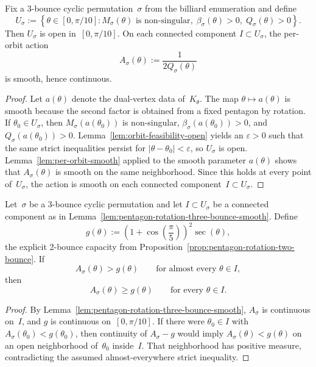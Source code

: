 \begin{unverified}
\begin{lemma}
\label{lem:pentagon-rotation-three-bounce-smooth}
Fix a 3-bounce cyclic permutation~$\sigma$ from the billiard enumeration and
define
\[
  U_\sigma
  :=
  \left\{
    \theta \in [0,\pi/10] :
    M_\sigma(\theta) \text{ is non-singular},\;
    \beta_\sigma(\theta) > 0,\;
    Q_\sigma(\theta) > 0
  \right\}.
\]
Then $U_\sigma$ is open in~$[0,\pi/10]$. On each connected component
$I \subset U_\sigma$, the per-orbit action
\[
  A_\sigma(\theta) := \frac{1}{2Q_\sigma(\theta)}
\]
is smooth, hence continuous.
\end{lemma}

\begin{proof}
Let $a(\theta)$ denote the dual-vertex data of~$K_\theta$.
The map $\theta \mapsto a(\theta)$ is smooth because the second factor is
obtained from a fixed pentagon by rotation.
If $\theta_0 \in U_\sigma$, then
$M_\sigma(a(\theta_0))$ is non-singular,
$\beta_\sigma(a(\theta_0)) > 0$,
and $Q_\sigma(a(\theta_0)) > 0$.
Lemma~\ref{lem:orbit-feasibility-open} yields an $\varepsilon > 0$ such that
the same strict inequalities persist for
$|\theta-\theta_0|<\varepsilon$, so $U_\sigma$ is open.
Lemma~\ref{lem:per-orbit-smooth} applied to the smooth parameter
$a(\theta)$ shows that $A_\sigma(\theta)$ is smooth on the same
neighborhood. Since this holds at every point of~$U_\sigma$, the action is
smooth on each connected component~$I \subset U_\sigma$.
\end{proof}
\end{unverified}

\begin{unverified}
\begin{lemma}
\label{lem:pentagon-rotation-three-bounce-continuity}
Let~$\sigma$ be a 3-bounce cyclic permutation and let $I \subset U_\sigma$ be
a connected component as in
Lemma~\ref{lem:pentagon-rotation-three-bounce-smooth}. Define
\[
  g(\theta)
  :=
  \left(1+\cos\left(\frac{\pi}{5}\right)\right)^2 \sec(\theta),
\]
the explicit 2-bounce capacity from
Proposition~\ref{prop:pentagon-rotation-two-bounce}. If
\[
  A_\sigma(\theta) > g(\theta)
  \qquad
  \text{for almost every } \theta \in I,
\]
then
\[
  A_\sigma(\theta) \ge g(\theta)
  \qquad
  \text{for every } \theta \in I.
\]
\end{lemma}

\begin{proof}
By Lemma~\ref{lem:pentagon-rotation-three-bounce-smooth},
$A_\sigma$ is continuous on~$I$, and $g$ is continuous on~$[0,\pi/10]$.
If there were $\theta_0 \in I$ with $A_\sigma(\theta_0) < g(\theta_0)$, then
continuity of $A_\sigma-g$ would imply $A_\sigma(\theta) < g(\theta)$ on an
open neighborhood of~$\theta_0$ inside~$I$. That neighborhood has positive
measure, contradicting the assumed almost-everywhere strict inequality.
\end{proof}
\end{unverified}


